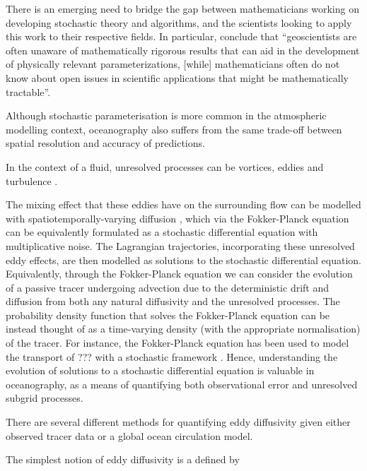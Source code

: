 There is an emerging need to bridge the gap between mathematicians working on developing stochastic theory and algorithms, and the scientists looking to apply this work to their respective fields.
In particular, \citet{BernerEtAl_2017_StochasticParameterizationNew} conclude that ``geoscientists are often unaware of mathematically rigorous results that can aid in the development of physically relevant parameterizations, [while] mathematicians often do not know about open issues in scientific applications that might be mathematically tractable''.


Although stochastic parameterisation is more common in the atmospheric modelling context, oceanography also suffers from the same trade-off between spatial resolution and accuracy of predictions.

In the context of a fluid, unresolved processes can be vortices, eddies and turbulence \citep{Griffa_1996_ApplicationsStochasticParticle}.

The mixing effect that these eddies have on the surrounding flow can be modelled with spatiotemporally-varying diffusion \citehere, which via the Fokker-Planck equation can be equivalently formulated as a stochastic differential equation with multiplicative noise.
The Lagrangian trajectories, incorporating these unresolved eddy effects, are then modelled as solutions to the stochastic differential equation.
Equivalently, through the Fokker-Planck equation we can consider the evolution of a passive tracer undergoing advection due to the deterministic drift and diffusion from both any natural diffusivity and the unresolved processes.
The probability density function that solves the Fokker-Planck equation can be instead thought of as a time-varying density (with the appropriate normalisation) of the tracer.
For instance, the Fokker-Planck equation has been used to model the transport of ??? with a stochastic framework \citehere.
Hence, understanding the evolution of solutions to a stochastic differential equation is valuable in oceanography, as a means of quantifying both observational error and unresolved subgrid processes.


There are several different methods for quantifying eddy diffusivity given either observed tracer data or a global ocean circulation model.

The simplest notion of eddy diffusivity is a defined by







